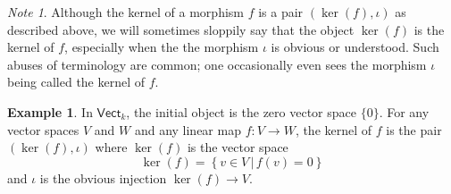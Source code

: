 \documentclass[a4paper]{report}
\theoremstyle{definition}
\newtheorem{example}{Example}[section]
\theoremstyle{plain}
\theoremstyle{remark}
\newtheorem{note}{Note}[section]
\begin{document}
\begin{note}
  Although the kernel of a morphism $f$ is a pair $(\ker(f), \iota)$ as described above, we will sometimes sloppily say that the object $\ker(f)$ is the kernel of $f$, especially when the the morphism $\iota$ is obvious or understood. Such abuses of terminology are common; one occasionally even sees the morphism $\iota$ being called the kernel of $f$.
\end{note} 

\begin{example}
  In $\mathsf{Vect}_{k}$, the initial object is the zero vector space $\{0\}$. For any vector spaces $V$ and $W$ and any linear map $f\colon V \to W$, the kernel of $f$ is the pair $(\ker(f), \iota)$ where $\ker(f)$ is the vector space  
  \begin{equation*}
    \ker(f) = \left\{ v \in V \,\big|\, f(v) = 0 \right\}
  \end{equation*}
  and $\iota$ is the obvious injection $\ker(f) \to V$.
\end{example}
\end{document}
